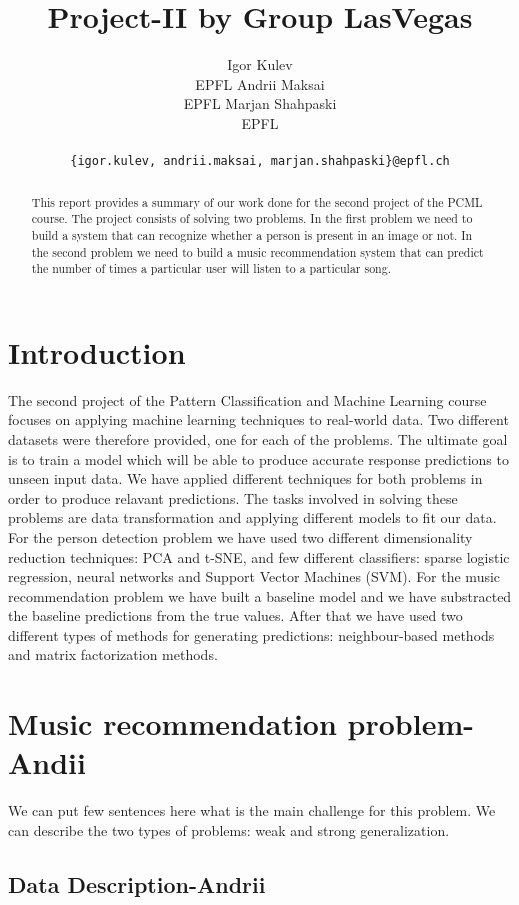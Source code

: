 \documentclass{article} %
\title{Project-II by Group LasVegas}
\author{
Igor Kulev \\
EPFL \And
Andrii Maksai \\
EPFL \And
Marjan Shahpaski \\
EPFL \\\\
\texttt{\{igor.kulev, andrii.maksai, marjan.shahpaski\}@epfl.ch}\\
}
\begin{document}
\maketitle

\begin{abstract}
This report provides a summary of our work done for the second project of the PCML course. The project consists of solving two problems. In the first problem we need to build a system that can recognize whether a person is present in an image or not. In the second problem we need to build a music recommendation system that can predict the number of times a particular user will listen to a particular song.
\end{abstract}

\section{Introduction}

The second project of the Pattern Classification and Machine Learning course focuses on applying machine learning techniques to real-world data. Two different datasets were therefore provided, one for each of the problems. The ultimate goal is to train a model which will be able to produce accurate response predictions to unseen input data. We have applied different techniques for both problems in order to produce relavant predictions. The tasks involved in solving these problems are data transformation and applying different models to fit our data. For the person detection problem we have used two different dimensionality reduction techniques: PCA and t-SNE, and few different classifiers: sparse logistic regression, neural networks and Support Vector Machines (SVM). For the music recommendation problem we have built a baseline model and we have substracted the baseline predictions from the true values. After that we have used two different types of methods for generating predictions: neighbour-based methods and matrix factorization methods.

\section{Music recommendation problem-Andii}

We can put few sentences here what is the main challenge for this problem. We can describe the two types of problems: weak and strong generalization.

\subsection{Data Description-Andrii}
\end{document}
